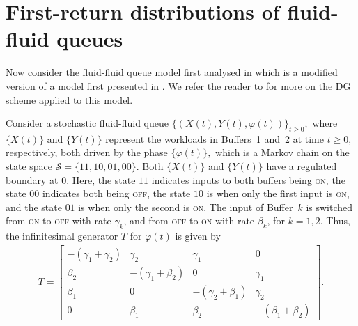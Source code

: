 \section{First-return distributions of fluid-fluid queues}\label{sec: ffq num}
Now consider the fluid-fluid queue model first analysed in \cite{blnos2022} which is a modified version of a model first presented in \cite{lnp13}. We refer the reader to \cite{blnos2022} for more on the DG scheme applied to this model. 
\begin{model}\label{model: ffq}
	Consider a stochastic fluid-fluid queue $\{(X(t),Y(t),\varphi(t))\}_{t\geq0},$ where $\{X(t)\}$ and $\{Y(t)\}$ represent the workloads in Buffers~1 and~2 at time $t \geq 0$, respectively, both driven by the phase $\{\varphi(t)\},$ which is a Markov chain on the state space $\mathcal{S} = \{11,10,01,00\}$. Both $\{X(t)\}$ and $\{Y(t)\}$ have a regulated boundary at 0. Here, the state $11$ indicates inputs to both buffers being \textnormal{\textsc{on}}, the state $00$ indicates both being \textnormal{\textsc{off}}, the state $10$ is when only the first input is \textnormal{\textsc{on}}, and the state $01$ is when only the second is \textnormal{\textsc{on}}. The input of Buffer~$k$ is switched from \textnormal{\textsc{on}} to \textnormal{\textsc{off}} with rate $\gamma_k$, and from \textnormal{\textsc{off}} to \textnormal{\textsc{on}} with rate $\beta_k$, for $k = 1, 2$. Thus, the infinitesimal generator $T$ for $\varphi(t)$ is given by 
	\begin{align*} 
		T = \left[ \begin{array}{cccc} -(\gamma_1 + \gamma_2) & \gamma_2 & \gamma_1 & 0 \\
							\beta_2 & -(\gamma_1 + \beta_2) & 0 & \gamma_1 \\
							\beta_1 & 0 & -(\gamma_2 + \beta_1) & \gamma_2 \\
							0 & \beta_1 &\beta_2 &-(\beta_1 + \beta_2)
	\end{array}\right].
	\end{align*} 


\end{model}
